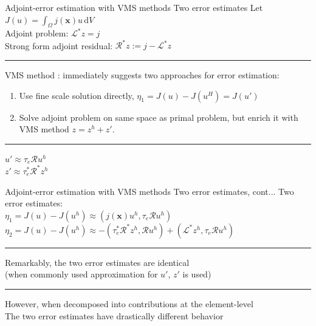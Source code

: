 \documentclass[fleqn]{beamer}
\newcommand{\bs}[1]{\boldsymbol{#1}}
\begin{document}

\begin{frame}{Adjoint-error estimation with VMS methods}
{Two error estimates}
Let $J(u) = \int_{\Omega} j(\bs{x}) u \, \text{d} V$ \\
Adjoint problem: $\mathcal{L}^* z = j$ \\
Strong form adjoint residual: $\mathcal{R}^*z := j - \mathcal{L}^*z$ \\ [8pt]
\hrule
\vspace{1em}
VMS method : immediately suggests two approaches for error estimation:
\begin{enumerate}
\item Use fine scale solution directly, $\eta_1 = J(u) - J(u^H) = J(u')$
\item Solve adjoint problem on same space as primal problem,
but enrich it with VMS method $z = z^h + z'$.
\end{enumerate}
\vspace{0.5em}
\hrule
\vspace{1em}
$u' \approx \tau_e \mathcal{R} u^h$ \\
$z' \approx \tau^*_e \mathcal{R}^* z^h$ \\
\end{frame}


\begin{frame}{Adjoint-error estimation with VMS methods}
{Two error estimates, cont...}
Two error estimates: \\ [4pt]
$\eta_1 = J(u) - J(u^h) \approx (j(\bs{x}) u^h, \tau_e \mathcal{R} u^h)$ \\ [4pt]
$\eta_2 = J(u) - J(u^h) \approx -(\tau_e^* \mathcal{R}^* z^h, \mathcal{R} u^h) + 
(\mathcal{L}^* z^h, \tau_e \mathcal{R} u^h)$ \\ [8pt]
\hrule
\vspace{1em}
Remarkably, the two error estimates are identical \\
(when commonly used approximation for $u'$, $z'$ is used) \\ [8pt]
\hrule
\vspace{1em}
However, when decomposed into contributions at the element-level \\
The two error estimates have drastically different behavior
\end{frame}
\end{document}
